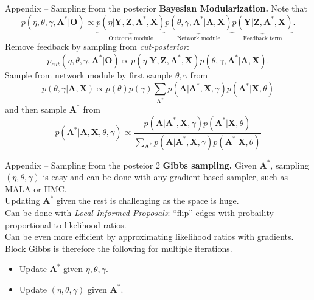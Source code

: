 \documentclass{beamer}
\def \bZ {\textbf{Z}}
\def \bA {\textbf{A}}
\def \bX {\textbf{X}}
\def \bY {\textbf{Y}}
\def \bO {\textbf{O}}
\begin{document}
    \begin{frame}[t]{Appendix -- Sampling from the posterior}
        \textbf{Bayesian Modularization.} Note that 
        \begin{equation*}
            p(\eta,\theta,\gamma,\bA^\ast \vert \bO) \propto 
            \underbrace{p(\eta \vert \bY,\bZ,\bA^\ast,\bX)}_{\text{Outcome module}}
            \underbrace{p(\theta,\gamma,\bA^\ast \vert \bA,\bX)}_{\text{Network module}}
            \underbrace{p(\bY \vert \bZ,\bA^\ast,\bX)}_{\text{Feedback term}}.
        \end{equation*}
        Remove feedback by sampling from \emph{cut-posterior}:
        \begin{equation*}
            p_{cut}(\eta,\theta,\gamma,\bA^\ast \vert \bO) \propto 
            p(\eta \vert \bY,\bZ,\bA^\ast,\bX)
            p(\theta,\gamma,\bA^\ast \vert \bA,\bX).
        \end{equation*}
        Sample from network module by first sample $\theta,\gamma$ from 
        $$p(\theta,\gamma \vert \bA,\bX) \propto
        p(\theta)p(\gamma)
        \sum_{\bA^\ast} 
        p(\bA\vert \bA^\ast,\bX,\gamma) 
        p(\bA^\ast \vert \bX,\theta)$$
         and then sample $\bA^\ast$ from
        $$p(\bA^\ast \vert \bA,\bX,\theta,\gamma) \propto   
        \frac{p(\bA\vert \bA^\ast,\bX,\gamma) 
        p(\bA^\ast \vert \bX,\theta)}{\sum_{\bA^\ast} 
        p(\bA\vert \bA^\ast,\bX,\gamma) 
        p(\bA^\ast \vert \bX,\theta)}$$
    \end{frame}

    \begin{frame}{Appendix -- Sampling from the posteior 2}
        \textbf{Gibbs sampling.} Given $\bA^\ast$, sampling $(\eta,\theta,\gamma)$ is easy and can be done with any 
        gradient-based sampler, such as MALA or HMC. 
        \\ 
        \vspace{0.3cm}
        Updating $\bA^\ast$ given the rest is challenging as the space is huge. 
        \\
        \vspace{0.3cm}
        Can be done with \emph{Local Informed Proposals}: 
        ``flip'' edges with probaility proportional to likelihood ratios. 
        \\
        \vspace{0.3cm}
        Can be even more efficient by approximating likelihood ratios with gradients. 
        \\
        \vspace{0.3cm}
        Block Gibbs is therefore the following for multiple iterations.
        \begin{itemize}
            \item Update $\bA^\ast$ given $\eta,\theta,\gamma$.
            \item Update $(\eta,\theta,\gamma)$ given $\bA^\ast$.
        \end{itemize}
    \end{frame}
\end{document}
